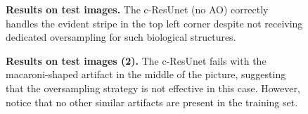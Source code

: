




\begin{figure}[!b]
\centering
{}
\caption{\textbf{Results on test images.} 
The c-ResUnet (no AO) correctly handles the evident stripe in the top left corner despite not receiving dedicated oversampling for such biological structures.
} 
\label{fig:predictions}
\end{figure}
\begin{figure}[ht]\ContinuedFloat
\centering

\caption{\textbf{Results on test images (2).} 
The c-ResUnet fails with the \mbox{macaroni-shaped} artifact in the middle of the picture, suggesting that the oversampling strategy is not effective in this case. However, notice that no other similar artifacts are present in the training set.
} 
\end{figure}
